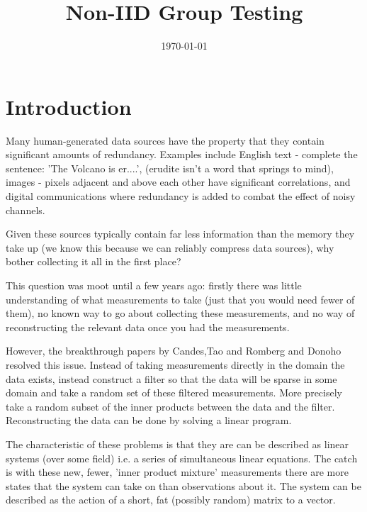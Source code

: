 \documentclass[11pt]{article}
\begin{document}
\title{Non-IID Group Testing}

\date{\today}

\maketitle

\section{Introduction}
Many human-generated data sources have the property that they contain significant amounts of redundancy. Examples include English text - complete the sentence: 'The Volcano is er....', (erudite isn't a word that springs to mind), images - pixels adjacent and above each other have significant correlations, and digital communications where redundancy is added to combat the effect of noisy channels. 

Given these sources typically contain far less information than the memory they take up (we know this because we can reliably compress data sources), why bother collecting it all in the first place?

This question was moot until a few years ago: firstly there was little understanding of what measurements to take (just that you would need fewer of them), no known way to go about collecting these measurements, and no way of reconstructing the relevant data once you had the measurements.

However, the breakthrough papers by Candes,Tao and Romberg \cite{RobustUncertainty} and Donoho \cite{Donoho} resolved this issue. Instead of taking measurements directly in the domain the data exists, instead construct a filter so that the data will be sparse in some domain and take a random set of these filtered measurements. More precisely take a random subset of the inner products between the data and the filter. Reconstructing the data can be done by solving a linear program. 

The characteristic of these problems is that they are can be described as linear systems (over some field) i.e. a series of simultaneous linear equations. The catch is with these new, fewer, 'inner product mixture' measurements there are more states that the system can take on than observations about it. The system can be described as the action of a short, fat (possibly random) matrix to a vector. 
\end{document}
